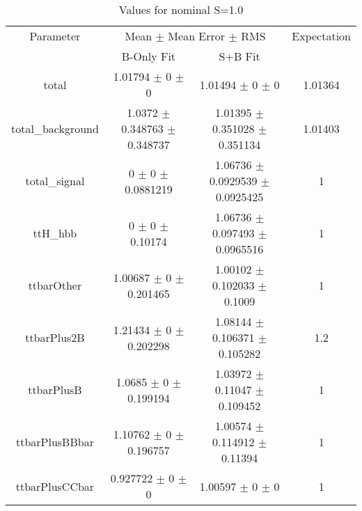 \begin{table}
\centering
\caption{Values for nominal S=1.0}
\begin{tabular}{cccc}
\toprule
Parameter & \multicolumn{2}{c}{Mean $\pm$ Mean Error $\pm$ RMS} & Expectation\\
 & B-Only Fit & S+B Fit & \\
\midrule
total & \num{1.01794} $\pm$ \num{0} $\pm$ \num{0} & \num{1.01494} $\pm$ \num{0} $\pm$ \num{0} & \num{1.01364}\\
total\_background & \num{1.0372} $\pm$ \num{0.348763} $\pm$ \num{0.348737} & \num{1.01395} $\pm$ \num{0.351028} $\pm$ \num{0.351134} & \num{1.01403}\\
total\_signal & \num{0} $\pm$ \num{0} $\pm$ \num{0.0881219} & \num{1.06736} $\pm$ \num{0.0929539} $\pm$ \num{0.0925425} & \num{1}\\
ttH\_hbb & \num{0} $\pm$ \num{0} $\pm$ \num{0.10174} & \num{1.06736} $\pm$ \num{0.097493} $\pm$ \num{0.0965516} & \num{1}\\
ttbarOther & \num{1.00687} $\pm$ \num{0} $\pm$ \num{0.201465} & \num{1.00102} $\pm$ \num{0.102033} $\pm$ \num{0.1009} & \num{1}\\
ttbarPlus2B & \num{1.21434} $\pm$ \num{0} $\pm$ \num{0.202298} & \num{1.08144} $\pm$ \num{0.106371} $\pm$ \num{0.105282} & \num{1.2}\\
ttbarPlusB & \num{1.0685} $\pm$ \num{0} $\pm$ \num{0.199194} & \num{1.03972} $\pm$ \num{0.11047} $\pm$ \num{0.109452} & \num{1}\\
ttbarPlusBBbar & \num{1.10762} $\pm$ \num{0} $\pm$ \num{0.196757} & \num{1.00574} $\pm$ \num{0.114912} $\pm$ \num{0.11394} & \num{1}\\
ttbarPlusCCbar & \num{0.927722} $\pm$ \num{0} $\pm$ \num{0} & \num{1.00597} $\pm$ \num{0} $\pm$ \num{0} & \num{1}\\
\bottomrule
\end{tabular}
\end{table}